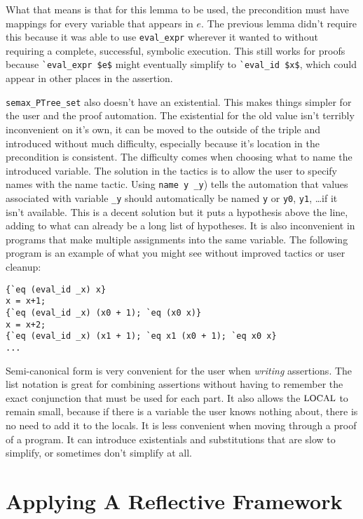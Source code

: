 \documentclass{puthesis}
\begin{document}
What that means is that for this lemma to be used, the precondition must
have mappings for every variable that appears in $e$. The previous 
lemma didn't require this because it was able to use \lstinline|eval_expr|
wherever it wanted to without requiring a complete, successful, symbolic
execution. This still works for proofs because \lstinline|`eval_expr $e$|
might eventually simplify to \lstinline|`eval_id $x$|, which could appear
in other places in the assertion. 

\lstinline|semax_PTree_set| also doesn't have an existential. This
makes things simpler for the user and the proof automation. The existential
for the old value isn't terribly inconvenient on it's own, it can be 
moved to the outside of the triple and introduced without much difficulty,
especially because it's location in the precondition is consistent. The
difficulty comes when choosing what to name the introduced variable. The
solution in the tactics is to allow the user to specify names with the name
tactic. Using \lstinline|name y _y|) tells the automation that values
associated with variable \lstinline|_y| should automatically be named
\lstinline|y| or \lstinline|y0|, \lstinline|y1|, \ldots if it isn't available.
This is a decent solution but it puts a hypothesis above the line, adding
to what can already be a long list of hypotheses. It is also inconvenient
in programs that make multiple assignments into the same variable. The
following program is an example of what you might see without improved
tactics or user cleanup: 

\begin{lstlisting}
{`eq (eval_id _x) x}
x = x+1;
{`eq (eval_id _x) (x0 + 1); `eq (x0 x)}
x = x+2;
{`eq (eval_id _x) (x1 + 1); `eq x1 (x0 + 1); `eq x0 x}
...
\end{lstlisting}



Semi-canonical form is very convenient for the user when \emph{writing}
assertions. The list notation is great for combining 
assertions without having to remember the exact conjunction that
must be used for each part. It also allows the $\mbox{\small LOCAL}$ to remain
small, because if there is a variable the user knows nothing
about, there is no need to add it to the locals. It is less convenient
when moving through a proof of a program. It can introduce
existentials and substitutions that are slow to simplify, or sometimes
don't simplify at all. 




\chapter{Applying A Reflective Framework}
\end{document}
